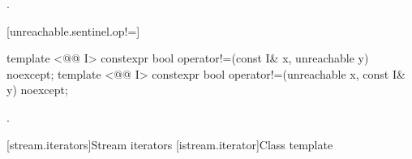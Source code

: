 \begin{itemdescr}
\pnum
\returns {}.
\end{itemdescr}

[unreachable.sentinel.op!=]{}

%
%
\begin{itemdecl}
template <@@ I>
  constexpr bool operator!=(const I& x, unreachable y) noexcept;
template <@@ I>
  constexpr bool operator!=(unreachable x, const I& y) noexcept;
\end{itemdecl}

\begin{itemdescr}
\pnum
\returns
{}.
\end{itemdescr}

[stream.iterators]{Stream iterators}
[istream.iterator]{Class template }


